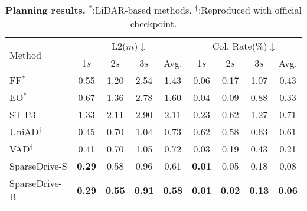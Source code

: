 \begin{table}[htbp]
\centering
\caption{\textbf{Planning results.} $^*$:LiDAR-based methods. $^\dagger$:Reproduced with official checkpoint.}
\label{tab:plan}
\resizebox{0.90\linewidth}{!}
{    
\begin{tabular}{l|cccc|cccc}
\toprule
\multirow{2}{*}{Method} &
\multicolumn{4}{c|}{L2($m$)$\downarrow$} & 
\multicolumn{4}{c}{Col. Rate(\%)$\downarrow$} \\
& 1$s$ & 2$s$ & 3$s$ & \cellcolor{gray!30}Avg. & 1$s$ & 2$s$ & 3$s$ & \cellcolor{gray!30}Avg.\\
\midrule
FF$^*$~\cite{ff} & 0.55 & 1.20 & 2.54 & \cellcolor{gray!30}1.43 & 0.06 & 0.17 & 1.07 & \cellcolor{gray!30}0.43 \\
EO$^*$~\cite{eo} & 0.67 & 1.36 & 2.78 & \cellcolor{gray!30}1.60 & 0.04 & 0.09 & 0.88 & \cellcolor{gray!30}0.33 \\
\midrule
ST-P3~\cite{stp3} & 1.33 & 2.11 & 2.90 & \cellcolor{gray!30}2.11 & 0.23 & 0.62 & 1.27 & \cellcolor{gray!30}0.71 \\
UniAD$^\dagger$~\cite{uniad} & 0.45 & 0.70 & 1.04 & \cellcolor{gray!30}0.73 & 0.62 & 0.58 & 0.63  & \cellcolor{gray!30}0.61 \\
VAD$^\dagger$~\cite{vad} & 0.41 & 0.70 & 1.05 & \cellcolor{gray!30}0.72 & 0.03 & 0.19 & 0.43  & \cellcolor{gray!30}0.21 \\ 
SparseDrive-S & \textbf{0.29} & 0.58 & 0.96 & \cellcolor{gray!30}0.61 & \textbf{0.01} & 0.05 & 0.18 & \cellcolor{gray!30}0.08 \\
SparseDrive-B &\textbf{0.29} & \textbf{0.55} & \textbf{0.91} & \cellcolor{gray!30}\textbf{0.58} & \textbf{0.01} & \textbf{0.02} & \textbf{0.13} & \cellcolor{gray!30}\textbf{0.06} \\
\bottomrule
\end{tabular}
}
\vspace{5pt}
\end{table} 